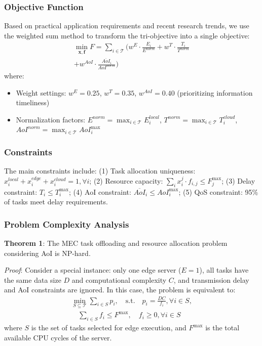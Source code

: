 \documentclass[conference]{IEEEtran}
\begin{document}
\subsubsection{Objective Function}
Based on practical application requirements and recent research trends, we use the weighted sum method to transform the tri-objective into a single objective:
\begin{equation}
    \begin{split}
        \min_{\mathbf{x}, \mathbf{f}} F = \sum_{i \in \mathcal{T}} \bigg( w^E \cdot \frac{E_i}{E^{norm}} + w^T \cdot \frac{T_i}{T^{norm}}
        \\+ w^{AoI} \cdot \frac{\overline{AoI}_i}{AoI^{norm}} \bigg)
    \end{split}
\end{equation}
where:
\begin{itemize}
    \item Weight settings: $w^E = 0.25$, $w^T = 0.35$, $w^{AoI} = 0.40$ (prioritizing information timeliness)
    \item Normalization factors: $E^{norm} = \max_{i \in \mathcal{T}} E_i^{local}$, $T^{norm} = \max_{i \in \mathcal{T}} T_i^{cloud}$, $AoI^{norm} = \max_{i \in \mathcal{T}} AoI_i^{\max}$
\end{itemize}

\subsubsection{Constraints}
The main constraints include:
(1) Task allocation uniqueness: $x_{i}^{local} + x_{i}^{edge} + x_{i}^{cloud} = 1, \forall i$;
(2) Resource capacity: $\sum_{i} x_{i}^{j} \cdot f_{i,j} \leq F_{j}^{\max}$;
(3) Delay constraint: $T_i \leq T_i^{\max}$;
(4) AoI constraint: $\overline{AoI}_i \leq AoI_i^{\max}$;
(5) QoS constraint: 95\% of tasks meet delay requirements.

\subsubsection{Problem Complexity Analysis}
\textbf{Theorem 1}: The MEC task offloading and resource allocation problem considering AoI is NP-hard.

\textit{Proof}: Consider a special instance: only one edge server ($E = 1$), all tasks have the same data size $D$ and computational complexity $C$, and transmission delay and AoI constraints are ignored. In this case, the problem is equivalent to:
\begin{equation}
    \begin{split}
        \min_{S \subseteq \mathcal{T}} \sum_{i \in S} p_i, \quad
        \text{s.t.} \quad p_i = \frac{DC}{f_i}, \forall i \in S, \\
        \quad
        \sum_{i \in S} f_i \leq F^{\max}, \quad
        f_i \geq 0, \forall i \in S
    \end{split}
\end{equation}
where $S$ is the set of tasks selected for edge execution, and $F^{\max}$ is the total available CPU cycles of the server.
\end{document}
